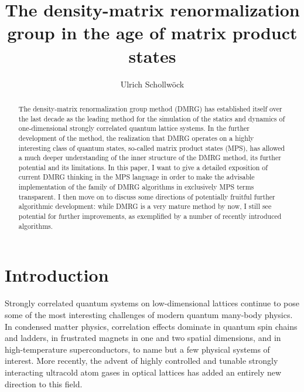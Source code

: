 \documentclass[a4paper,10pt,oneside,onecolumn,1p,times]{elsarticle}
\begin{document}
\title{The density-matrix renormalization group in the age of matrix product states}
\author{Ulrich Schollw\"{o}ck}
\address{Department of Physics, Arnold Sommerfeld Center for Theoretical Physics and Center for NanoScience, University of Munich, Theresienstrasse 37, 80333 Munich, Germany \\
Institute for Advanced Study Berlin, Wallotstrasse 19, 14159 Berlin, Germany}

\begin{abstract}
The density-matrix renormalization group method (DMRG) has established itself over the last decade as the leading method for the simulation of the statics and dynamics of one-dimensional strongly correlated quantum lattice systems. In the further development of the method, the realization that DMRG operates on a highly interesting class of quantum states, so-called matrix product states (MPS), has allowed a much deeper understanding of the inner structure of the DMRG method, its further potential and its limitations. In this paper, I want to give a detailed exposition of current DMRG thinking in the MPS language in order to make the advisable implementation of the family of DMRG algorithms in exclusively MPS terms transparent. I then move on to discuss some directions of potentially fruitful further algorithmic development: while DMRG is a very mature method by now, I still see potential for further improvements, as exemplified by a number of recently introduced algorithms.   
\end{abstract}

\maketitle 

\tableofcontents

\section{Introduction}
Strongly correlated quantum systems on low-dimensional lattices continue to pose some of the most interesting challenges of modern quantum many-body physics. In condensed matter physics,  correlation effects dominate in quantum spin chains and ladders, in frustrated magnets in one and two spatial dimensions, and in high-temperature superconductors, to name but a few physical systems of interest. More recently, the advent of highly controlled and tunable strongly interacting ultracold atom gases in optical lattices has added an entirely new direction to this field\cite{Bloch08}. 
\end{document}
